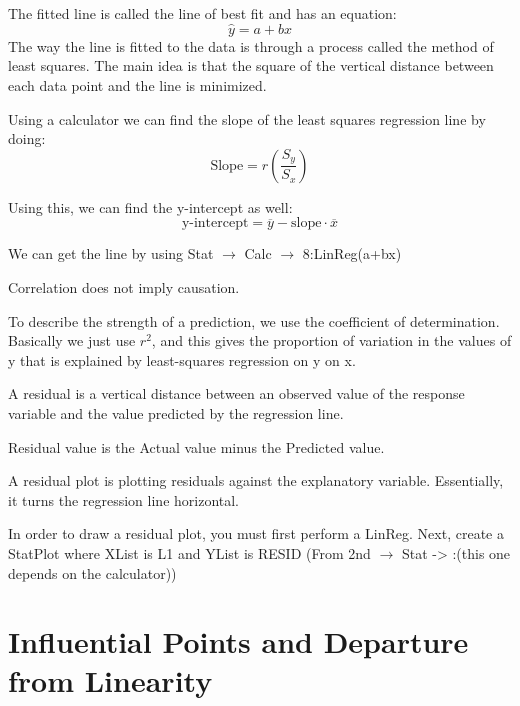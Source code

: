 \documentclass[../stats.tex]{subfiles}
\begin{document}
The fitted line is called the line of best fit and has an equation:
\[\hat{y}=a+bx\]
The way the line is fitted to the data is through a process called the method of least squares. 
The main idea is that the square of the vertical distance between each data point and the line is minimized. 

Using a calculator we can find the slope of the least squares regression line by doing:
\[\text{Slope}=r\left(\frac{S_y}{S_x}\right)\]

Using this, we can find the y-intercept as well:
\[\text{y-intercept}=\overline{y}-\text{slope}\cdot\overline{x}\]

We can get the line by using Stat $\rightarrow$ Calc $\rightarrow$ 8:LinReg(a+bx)

Correlation does not imply causation.

To describe the strength of a prediction, we use the coefficient of determination. 
Basically we just use $r^2$, and this gives the proportion of variation in the values of y that is 
explained by least-squares regression on y on x.

A residual is a vertical distance between an observed value of the response 
variable and the value predicted by the regression line. 

Residual value is the Actual value minus the Predicted value.

A residual plot is plotting residuals against the explanatory variable. Essentially, it turns the regression line horizontal. 

In order to draw a residual plot, you must first perform a LinReg. Next, create a 
StatPlot where XList is L1 and YList is RESID (From 2nd $\rightarrow$ Stat -> :(this one depends on the calculator))

\section{Influential Points and Departure from Linearity}
\end{document}
